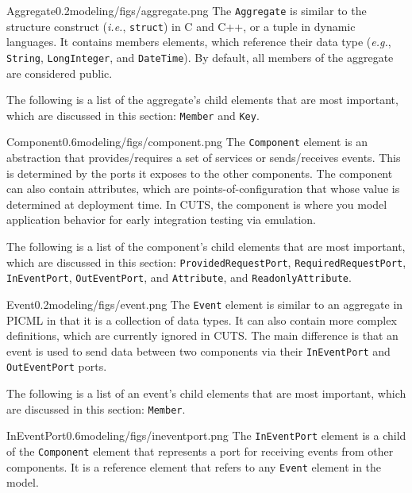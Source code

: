 \begin{modelelement}{Aggregate}{0.2}{modeling/figs/aggregate.png}
The \texttt{Aggregate} is similar to the structure construct (\textit{i.e.}, 
\texttt{struct}) in C and C++, or a tuple in dynamic languages. It 
contains members elements, which reference their data type (\textit{e.g.}, 
\texttt{String}, \texttt{LongInteger}, and \texttt{DateTime}). By
default, all members of the aggregate are considered public.

The following is a list of the aggregate's child elements that
are most important, which are discussed in this section: 
\texttt{Member} and \texttt{Key}.
\end{modelelement}

\begin{modelelement}{Component}{0.6}{modeling/figs/component.png}
The \texttt{Component} element is an abstraction that provides/\-requires 
a set of services or sends/\-receives events. This is determined by
the ports it exposes to the other components. The component can
also contain attributes, which are points-of-configuration that
whose value is determined at deployment time. In CUTS, the component 
is where you model application behavior for early integration
testing via emulation. 

The following is a list of the component's child elements that
are most important, which are discussed in this section: 
\texttt{ProvidedRequestPort}, \texttt{RequiredRequestPort},
\texttt{InEventPort}, \texttt{OutEventPort}, and \texttt{At\-tri\-bute},
and \texttt{Read\-onlyAt\-tri\-bute}.
\end{modelelement}

\clearpage

\begin{modelelement}{Event}{0.2}{modeling/figs/event.png}
The \texttt{Event} element is similar to an aggregate in PICML in 
that it is a collection of data types. It can also contain 
more complex definitions, which are currently ignored in
CUTS. The main difference is that an event is used to send
data between two components via their \texttt{InEventPort}
and \texttt{Out\-Event\-Port} ports. 

The following is a 
list of an event's child elements that are most important, 
which are discussed in this section: \texttt{Member}.
\end{modelelement}

\begin{modelelement}{InEventPort}{0.6}{modeling/figs/ineventport.png}
The \texttt{InEventPort} element is a child of the \texttt{Component}
element that represents a port for receiving events from other components.
It is a reference element that refers to any \texttt{Event} element in
the model.
\end{modelelement}

